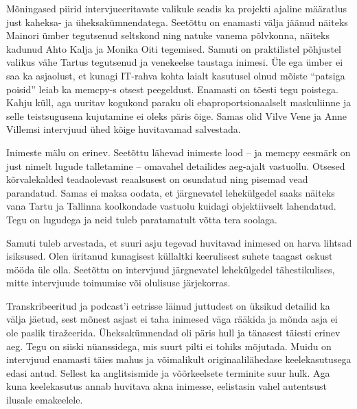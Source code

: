 Mõningased piirid intervjueeritavate valikule seadis ka projekti ajaline määratlus just 
kaheksa- ja üheksakümnendatega. Seetõttu on enamasti välja jäänud näiteks 
Mainori ümber tegutsenud seltskond ning natuke vanema põlvkonna, 
näiteks kadunud Ahto Kalja ja Monika 
Oiti tegemised. Samuti on praktilistel põhjustel 
valikus vähe Tartus tegutsenud ja venekeelse taustaga inimesi. Üle ega 
ümber ei saa ka asjaolust, et kunagi IT-rahva kohta laialt kasutusel olnud 
mõiste \enquote{patsiga poisid} leiab ka memcpy-s otsest peegeldust. Enamasti 
on tõesti tegu poistega. Kahju küll, aga uuritav kogukond paraku oli 
ebaproportsionaalselt maskuliinne ja selle teistsugusena kujutamine ei oleks 
päris õige. Samas olid Vilve Vene ja Anne 
Villemsi intervjuud ühed kõige huvitavamad salvestada.

Inimeste mälu on erinev. Seetõttu lähevad inimeste lood -- ja memcpy eesmärk on just nimelt lugude 
talletamine -- omavahel detailides aeg-ajalt vastuollu. Otsesed 
kõrvalekalded teadaolevast reaalsusest on osundatud ning pisemad vead 
parandatud. Samas ei maksa oodata, et järgnevatel lehekülgedel saaks näiteks vana 
Tartu ja Tallinna koolkondade vastuolu kuidagi objektiivselt lahendatud. 
Tegu on lugudega ja neid tuleb paratamatult võtta tera soolaga.

Samuti tuleb arvestada, et suuri asju tegevad huvitavad inimesed on harva 
lihtsad isiksused. Olen üritanud kunagisest küllaltki keerulisest suhete taagast 
oskust mööda üle olla. Seetõttu on intervjuud järgnevatel lehekülgedel 
tähestikulises, mitte intervjuude toimumise või olulisuse järjekorras. 

Transkribeeritud ja podcast'i eetrisse läinud juttudest on üksikud 
detailid ka välja jäetud, sest mõnest asjast ei taha inimesed väga rääkida ja 
mõnda asja ei ole paslik tiražeerida. Üheksakümnendad oli päris hull ja 
tänasest täiesti erinev aeg. Tegu on siiski nüanssidega, mis suurt pilti ei 
tohiks mõjutada. Muidu on intervjuud enamasti täies mahus ja võimalikult originaalilähedase keelekasutusega edasi antud. 
Sellest ka anglitsismide ja võõrkeelsete terminite suur hulk. 
Aga kuna keelekasutus annab huvitava akna inimesse, eelistasin vahel autentsust 
ilusale emakeelele.

